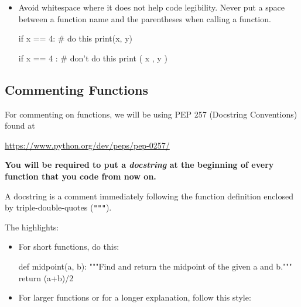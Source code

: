 \documentclass[11pt]{cselabheader}
\begin{document}
{\begin{itemize}
    \begin{python3code}
x = x + 1 # Increment x
    \end{python3code}

    should be avoided. It is obvious that  is being incremented.
    Instead, if you think a comment will improve code comprehension, the
    following can be useful:

    \begin{python3code}
x = x + 1 # Compensate for border
    \end{python3code}

  \item Avoid whitespace where it does not help code legibility. Never put a
    space between a function name and the parentheses when calling a function.

    \begin{python3code}
if x == 4: # do this
    print(x, y)

if x == 4 : # don't do this
    print ( x , y )
    \end{python3code}
\end{itemize}

\pagebreak
\subsection{Commenting Functions}

For commenting on functions, we will be using PEP 257 (Docstring Conventions)
found at
\begin{center}
  \url{https://www.python.org/dev/peps/pep-0257/}
\end{center}

\begin{center}
\bfseries \large You will be required to put a \emph{docstring} at the beginning
of every function that you code from now on.
\end{center}
A docstring is a comment immediately
following the function definition enclosed by triple-double-quotes (\texttt{"""}).

The highlights:
\begin{itemize}
  \item For short functions, do this:

    \begin{python3code}
def midpoint(a, b):
    """Find and return the midpoint of the given a and b."""
    return (a+b)/2
    \end{python3code}

  \item For larger functions or for a longer explanation, follow this style:


\end{itemize}}
\end{document}

